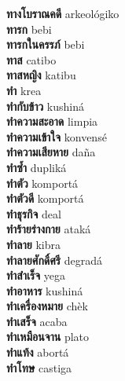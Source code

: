 \textbf{ ทางโบราณคดี  } arkeológiko \\
\textbf{ ทารก  } bebi \\
\textbf{ ทารกในครรภ์  } bebi \\
\textbf{ ทาส  } catibo \\
\textbf{ ทาสหญิง  } katibu \\
\textbf{ ทำ  } krea \\
\textbf{ ทำกับข้าว  } kushiná \\
\textbf{ ทำความสะอาด  } limpia \\
\textbf{ ทำความเข้าใจ  } konvensé \\
\textbf{ ทำความเสียหาย  } daña \\
\textbf{ ทำซ้ำ  } dupliká \\
\textbf{ ทำตัว  } komportá \\
\textbf{ ทำตัวดี  } komportá \\
\textbf{ ทำธุรกิจ  } deal \\
\textbf{ ทำร้ายร่างกาย  } ataká \\
\textbf{ ทำลาย  } kibra \\
\textbf{ ทำลายศักดิ์ศรี  } degradá \\
\textbf{ ทำสำเร็จ  } yega \\
\textbf{ ทำอาหาร  } kushiná \\
\textbf{ ทำเครื่องหมาย  } chèk \\
\textbf{ ทำเสร็จ  } acaba \\
\textbf{ ทำเหมือนจาน  } plato \\
\textbf{ ทำแท้ง  } abortá \\
\textbf{ ทำโทษ  } castiga \\

